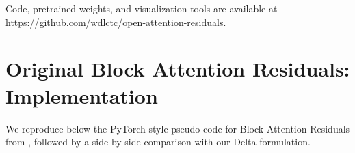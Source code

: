\documentclass{article}
\begin{document}
Code, pretrained weights, and visualization tools are available at \url{https://github.com/wdlctc/open-attention-residuals}.




\newpage
\appendix

\section{Original Block Attention Residuals: Implementation}
\label{app:block_attnres}

We reproduce below the PyTorch-style pseudo code for Block Attention Residuals from \citet{kimi2025attention}, followed by a side-by-side comparison with our Delta formulation.
\end{document}
